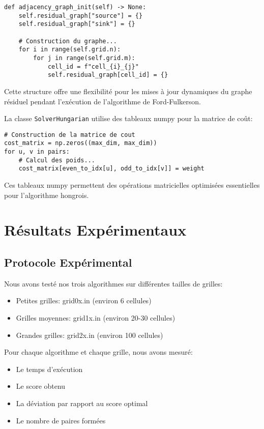 \documentclass[11pt, a4paper]{article}
\begin{document}
\begin{lstlisting}[caption=Initialisation du graphe d'adjacence]
def adjacency_graph_init(self) -> None:
    self.residual_graph["source"] = {}
    self.residual_graph["sink"] = {}
    
    # Construction du graphe...
    for i in range(self.grid.n):
        for j in range(self.grid.m):
            cell_id = f"cell_{i}_{j}"
            self.residual_graph[cell_id] = {}
\end{lstlisting}

Cette structure offre une flexibilité pour les mises à jour dynamiques du graphe résiduel pendant l'exécution de l'algorithme de Ford-Fulkerson.

La classe \texttt{SolverHungarian} utilise des tableaux numpy pour la matrice de coût:

\begin{lstlisting}[caption=Construction de la matrice de cout]
# Construction de la matrice de cout
cost_matrix = np.zeros((max_dim, max_dim))
for u, v in pairs:
    # Calcul des poids...
    cost_matrix[even_to_idx[u], odd_to_idx[v]] = weight
\end{lstlisting}

Ces tableaux numpy permettent des opérations matricielles optimisées essentielles pour l'algorithme hongrois.

\section{Résultats Expérimentaux}
\label{sec:resultats}

\subsection{Protocole Expérimental}

Nous avons testé nos trois algorithmes sur différentes tailles de grilles:
\begin{itemize}
    \item Petites grilles: grid0x.in (environ 6 cellules)
    \item Grilles moyennes: grid1x.in (environ 20-30 cellules)
    \item Grandes grilles: grid2x.in (environ 100 cellules)
\end{itemize}

Pour chaque algorithme et chaque grille, nous avons mesuré:
\begin{itemize}
    \item Le temps d'exécution
    \item Le score obtenu
    \item La déviation par rapport au score optimal
    \item Le nombre de paires formées
\end{itemize}
\end{document}
